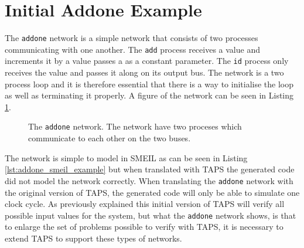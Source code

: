 %




\section{Initial Addone Example}
The \texttt{addone} network is a simple network that consists of two processes communicating with one another. The \texttt{add} process receives a value and increments it by a value passes a as a constant parameter. The \texttt{id} process only receives the value and passes it along on its output bus.
The network is a two process loop and it is therefore essential that there is a way to initialise the loop as well as terminating it properly.
A figure of the network can be seen in Listing \ref{fig:addone_unclocked}.\\

\begin{figure}
    \centering
    \caption{The \texttt{addone} network. The network have two proceses which communicate to each other on the two buses.}
    \label{fig:addone_unclocked}
\end{figure}
The network is simple to model in SMEIL as can be seen in Listing \ref{lst:addone_smeil_example} but when translated with TAPS the generated \cspm{} code did not model the network correctly. When translating the \texttt{addone} network with the original version of TAPS, the generated \cspm{} code will only be able to simulate one clock cycle. As previously explained%
this initial version of TAPS will verify all possible input values for the system, but what the \texttt{addone} network shows, is that to enlarge the set of problems possible to verify with TAPS, it is necessary to extend TAPS to support these types of networks. \\

